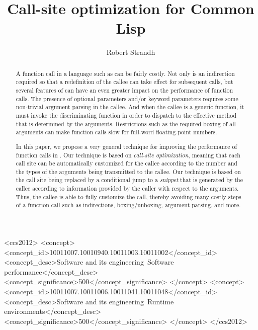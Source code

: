 \documentclass[format=sigconf]{acmart}
\begin{document}
\title{Call-site optimization for Common Lisp}

\author{Robert Strandh}


\begin{abstract}
A function call in a language such as \commonlisp{} can be fairly
costly.  Not only is an indirection required so that a redefinition of
the callee can take effect for subsequent calls, but several features
of \commonlisp{} can have an even greater impact on the performance of
function calls.  The presence of optional parameters and/or keyword
parameters requires some non-trivial argument parsing in the callee.
And when the callee is a generic function, it must invoke the
discriminating function in order to dispatch to the effective
method that is determined by the arguments.  Restrictions such as the
required boxing of all arguments can make function calls slow for
full-word floating-point numbers.

In this paper, we propose a very general technique for improving the
performance of function calls in \commonlisp{}.  Our technique is
based on \emph{call-site optimization}, meaning that each call site
can be automatically customized for the callee according to the number
and the types of the arguments being transmitted to the callee.  Our
technique is based on the call site being replaced by a conditional
jump to a \emph{snippet} that is generated by the callee according to
information provided by the caller with respect to the arguments.
Thus, the callee is able to fully customize the call, thereby avoiding
many costly steps of a function call such as indirections,
boxing/unboxing, argument parsing, and more.
\end{abstract}

\begin{CCSXML}
<ccs2012>
<concept>
<concept_id>10011007.10010940.10011003.10011002</concept_id>
<concept_desc>Software and its engineering~Software performance</concept_desc>
<concept_significance>500</concept_significance>
</concept>
<concept>
<concept_id>10011007.10011006.10011041.10011048</concept_id>
<concept_desc>Software and its engineering~Runtime environments</concept_desc>
<concept_significance>500</concept_significance>
</concept>
</ccs2012>
\end{CCSXML}

\end{document}
